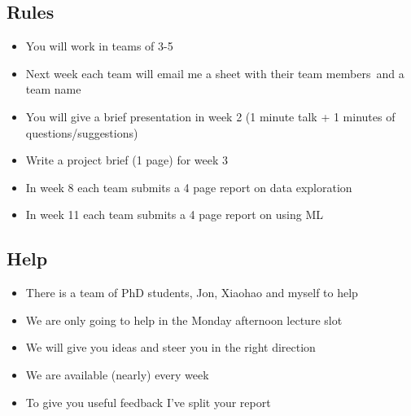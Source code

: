 \begin{slide}
\section{Rules}

\begin{PauseHighLight}
  \begin{itemize}
  \item You will work in teams of 3-5\pause
  \item Next week each team will email me a sheet with their team
    members\pause\ and a team name\pauseb
  \item You will give a brief presentation in week 2 (1 minute talk + 1
    minutes of questions/suggestions)\pause
  \item Write a project brief (1 page) for week 3\pause
  \item In week 8 each team submits a 4 page report on data exploration\pause
  \item In week 11 each team submits a 4 page report on using ML\pause
  \end{itemize}
\end{PauseHighLight}

\end{slide}


\begin{slide}
\section{Help}

\begin{PauseHighLight}
  \begin{itemize}
  \item There is a team of PhD students, Jon, Xiaohao and myself to help\pause
  \item We are only going to help in the Monday afternoon lecture slot\pause
  \item We will give you ideas and steer you in the right direction\pause
  \item We are available (nearly) every week\pause
  \item To give you useful feedback I've split your report\pause
  \end{itemize}
\end{PauseHighLight}

\end{slide}

